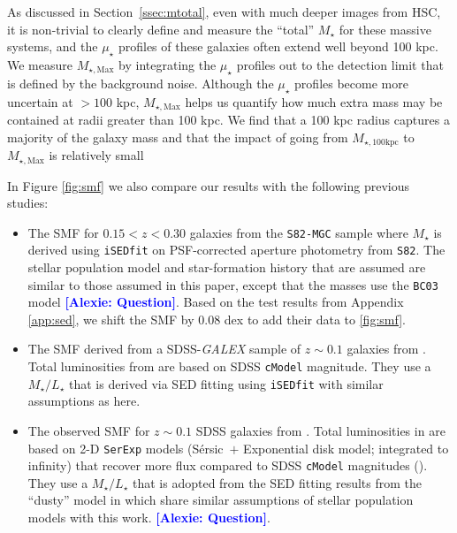 \documentclass[a4paper,fleqn,usenatbib]{mnras}
\def\ser{{S\'{e}rsic\ }}
\def\cmodel{\texttt{cModel}}
\def\mstar{{$M_{\star}$}}
\def\mtot{{$M_{\star,100\mathrm{kpc}}$}}
\def\mmax{{$M_{\star,\mathrm{Max}}$}}
\def\m2l{{$M_{\star}/L_{\star}$}}
\def\mden{{$\mu_{\star}$}}
\newcommand{\alexie}[1]{\textcolor{blue}{\textbf{[Alexie: #1]}}}
\begin{document}
    As discussed in Section~\ref{ssec:mtotal}, even with much deeper images from HSC,
    it is non-trivial to clearly define and measure the ``total'' \mstar{} for 
    these massive systems, and the \mden{} profiles of these galaxies often extend 
    well beyond 100 kpc. 
    We measure \mmax{} by integrating the \mden{} profiles out to the detection 
    limit that is defined by the background noise.
    Although the \mden{} profiles become more uncertain at $>100$ kpc, \mmax{} helps us quantify how much extra mass may be contained at radii greater than 100 kpc.  We find that  a 100 kpc radius captures a majority of the galaxy mass and that the impact of going from \mtot{} to \mmax{} is relatively small
   
    
    
    In Figure \ref{fig:smf} we also compare our results  with the following previous studies:

    \begin{itemize}

        \item The SMF for $0.15 < z < 0.30$ galaxies from the \texttt{S82-MGC} sample
            \citep{Leauthaud2016} where \mstar{} is derived using 
            \texttt{iSEDfit} on PSF-corrected aperture photometry from 
            \texttt{S82}.
            The stellar population model and star-formation history that are assumed are similar to those assumed in this paper, except that the \citep{Leauthaud2016} masses use the \texttt{BC03} model \alexie{Question}. 
            Based on the test results from Appendix \ref{app:sed}, we shift the \citep{Leauthaud2016} SMF by 0.08 dex to add their data to \ref{fig:smf}. 
        \item The SMF derived from a SDSS-\textit{GALEX} sample of $z{\sim} 0.1$ 
            galaxies from \citet{Moustakas13}.  Total luminosities from \citet{Moustakas13} are based on SDSS \cmodel{} magnitude. 
            They use a \m2l{} that is derived via SED fitting using \texttt{iSEDfit} with similar 
            assumptions as here.
            
        \item The observed SMF for $z{\sim} 0.1$ SDSS galaxies from 
            \citet{Bernardi2017}.  Total luminosities in  \citet{Bernardi2017} are based on 2-D \texttt{SerExp} models 
            (\ser{}$+$ Exponential disk model; integrated to infinity) that 
            recover more flux compared to SDSS \cmodel{} magnitudes 
            (\citealt{Bernardi2013, Meert2015}). 
            They use a  \m2l{} that is adopted from the SED fitting results from the ``dusty'' 
            model in \citet{Mendel2014} which share similar assumptions of stellar 
            population models with this work. \alexie{Question}.   
    \end{itemize}
    
\end{document}
